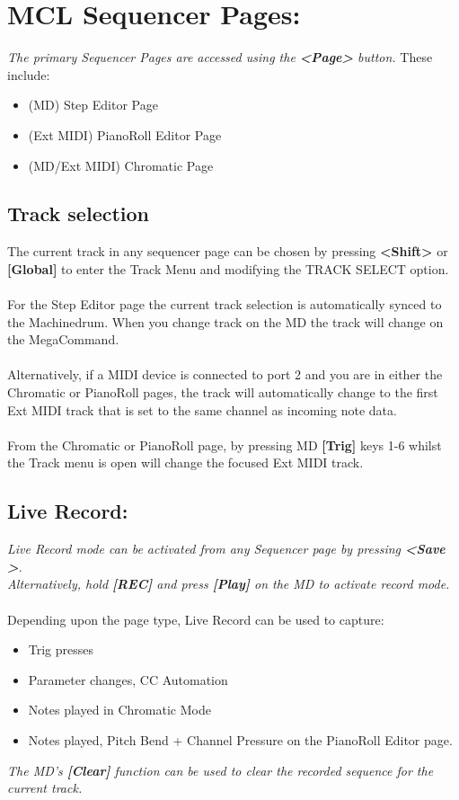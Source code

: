 \chapter{MCL Sequencer Pages:}

\textit{The primary Sequencer Pages are accessed using the \textbf{<Page>} button.} These include:
\begin{itemize}
    \item (MD) Step Editor Page
    \item (Ext MIDI) PianoRoll Editor Page
    \item (MD/Ext MIDI) Chromatic Page
\end{itemize}
\section{Track selection}
The current track in any sequencer page can be chosen by pressing \textbf{<Shift>} or \textbf{[Global]} to enter the Track Menu and modifying the TRACK SELECT option.
\\\\
For the Step Editor page the current track selection is automatically synced to the Machinedrum. When you change track on the MD the track will change on the MegaCommand.\\\\
Alternatively, if a MIDI device is connected to port 2 and you are in either the Chromatic or PianoRoll pages, the track will automatically change to the first Ext MIDI track that is set to the same channel as incoming note data.\\\\
From the Chromatic or PianoRoll page, by pressing MD \textbf{[Trig]} keys 1-6 whilst the Track menu is open will change the focused Ext MIDI track.
\section{Live Record:}
\textit{Live Record mode can be activated from any Sequencer page by pressing \textbf{<Save >}.\\Alternatively, hold \textbf{[REC]} and press \textbf{[Play]} on the MD to activate record mode.}\\\\Depending upon the page type, Live Record can be used to capture:
\begin{itemize}
    \item Trig presses
    \item Parameter changes, CC Automation
    \item Notes played in Chromatic Mode
    \item Notes played, Pitch Bend + Channel Pressure on the PianoRoll Editor page.
\end{itemize}
\textit{The MD's \textbf{[Clear]} function can be used to clear the recorded sequence for the current track.}

